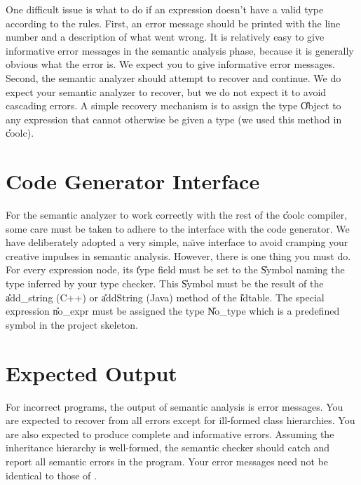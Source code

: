 \documentclass[11pt]{article}
\begin{document}
One difficult issue is what to do if an expression doesn't have a valid
type according to the rules.  First, an error message should be printed
with the line number and a description of what went wrong.  It is
relatively easy to give informative error messages in the semantic
analysis phase, because it is generally obvious what the error is.  We
expect you to give informative error messages.  Second, the semantic
analyzer should attempt to recover and continue.
We do expect your semantic analyzer to recover, but we do
not expect it to avoid cascading errors.  A simple recovery mechanism is
to assign the type \U{Object} to any expression that cannot otherwise be
given a type (we used this method in \U{coolc}). 

\section{Code Generator Interface}

For the semantic analyzer to work correctly with the rest of the
\U{coolc} compiler, some care must be taken to adhere to the interface
with the code generator.  We have deliberately adopted a very simple,
na\"\i{}ve interface to avoid cramping your creative impulses in semantic
analysis.  However, there is one thing you must do.  For every
expression node, its \U{type} field must be set to the \U{Symbol} naming
the type inferred by your type checker. This \U{Symbol} must be the
result of the \U{add\_string} (C++) or \U{addString} (Java) method of
the \U{idtable}.  The special expression \U{no\_expr} must be assigned
the type \U{No\_type} which is a predefined symbol in the project
skeleton.

\section{Expected Output}

For incorrect programs, the output of semantic analysis is error
messages.  You are expected to recover from all errors except for
ill-formed class hierarchies.  You are also expected to produce complete
and informative errors.  Assuming the inheritance hierarchy is
well-formed, the semantic checker should catch and report all semantic
errors in the program.
Your error
messages need not be identical to those of .
\end{document}
